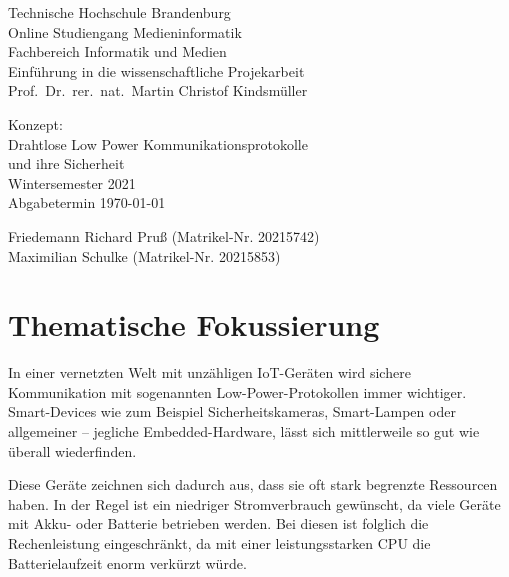 \documentclass{article}
\title{\titlecontent}
\author{Friedemann Richard Pruß, Maximilian Schulke}
\begin{document}
\begin{titlepage}
	\begin{flushleft}
		Technische Hochschule Brandenburg \\
		Online Studiengang Medieninformatik \\
		Fachbereich Informatik und Medien \\
		Einführung in die wissenschaftliche Projekarbeit\\
		Prof.\ Dr.\ rer.\ nat.\ Martin Christof Kindsmüller
	\end{flushleft}

	\vfill

	\begin{center}
		\large{Konzept:}\\
		\Huge{
			Drahtlose Low Power Kommunikationsprotokolle\\
			und ihre Sicherheit
		}\\[0.5em]
		\large{Wintersemester 2021}\\[0.25em]
		\large{Abgabetermin \today}
	\end{center}

	\vfill

	\begin{flushright}
		Friedemann Richard Pruß (Matrikel-Nr. 20215742)\\
		Maximilian Schulke (Matrikel-Nr. 20215853)
	\end{flushright}
\end{titlepage}

\newpage

\tableofcontents

\section{Thematische Fokussierung}

In einer vernetzten Welt mit unzähligen IoT-Geräten wird sichere Kommunikation
mit sogenannten Low-Power-Protokollen immer wichtiger. Smart-Devices wie zum
Beispiel Sicherheitskameras, Smart-Lampen oder allgemeiner – jegliche
Embedded-Hardware, lässt sich mittlerweile so gut wie überall wiederfinden.

Diese Geräte zeichnen sich dadurch aus, dass sie oft stark begrenzte Ressourcen
haben. In der Regel ist ein niedriger Stromverbrauch gewünscht, da viele Geräte
mit Akku- oder Batterie betrieben werden. Bei diesen ist folglich die
Rechenleistung eingeschränkt, da mit einer leistungsstarken CPU die
Batterielaufzeit enorm verkürzt würde.
\end{document}
